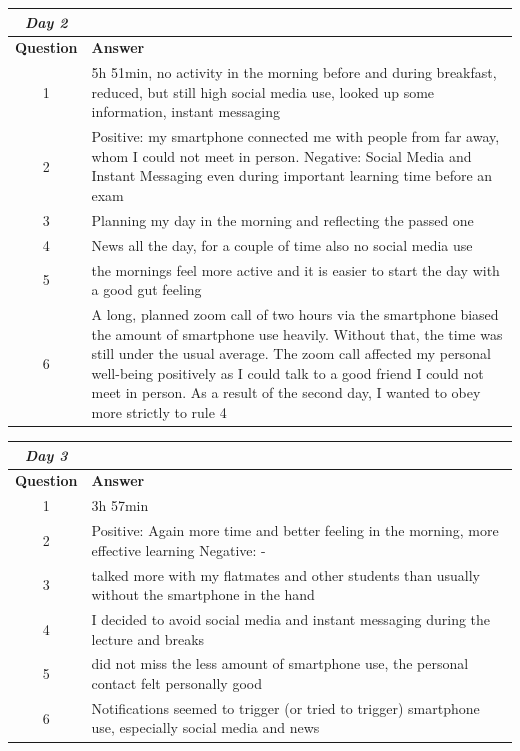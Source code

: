\begin{table}[H]
	\centering
	
\begin{tabularx}{\textwidth}{cb}
\textbf{\textit{Day 2}} &    \\ \midrule[2pt]	
	\textbf{Question}&\textbf{Answer}\\ \toprule[1.3pt]	
	1 & 5h 51min, no activity in the morning before and during breakfast, reduced, but still high social media use, looked up some information, instant messaging \\ \midrule[0.5pt]
	2 & Positive: my smartphone connected me with people from far away, whom I could not meet in person. Negative: Social Media and Instant Messaging even during important learning time before an exam \\ \midrule[0.5pt]
	3 & Planning my day in the morning and reflecting the passed one \\ \midrule[0.5pt]
	4 & News all the day, for a couple of time also no social media use \\ \midrule[0.5pt]
	5 & the mornings feel more active and it is easier to start the day with a good gut feeling \\ \midrule[0.5pt]
	6 & A long, planned zoom call of two hours via the smartphone biased the amount of smartphone use heavily. Without that, the time was still under the usual average. The zoom call affected my personal well-being positively as I could talk to a good friend I could not meet in person. As a result of the second day, I wanted to obey more strictly to rule 4  \\ \bottomrule[1.3pt]
\end{tabularx}

\end{table}

\begin{table}[H]
	\centering
	
\begin{tabularx}{\textwidth}{cb}
\textbf{\textit{Day 3}} &    \\ \midrule[2pt]	
	\textbf{Question}&\textbf{Answer}\\ \toprule[1.3pt]	
	1 & 3h 57min  \\ \midrule[0.5pt]
	2 & Positive: Again more time and better feeling in the morning, more effective learning Negative: - \\ \midrule[0.5pt]
	3 & talked more with my flatmates and other students than usually without the smartphone in the hand\\ \midrule[0.5pt]
	4 & I decided to avoid social media and instant messaging during the lecture and breaks \\ \midrule[0.5pt]
	5 & did not miss the less amount of smartphone use, the personal contact felt personally good \\ \midrule[0.5pt]
	6 & Notifications seemed to trigger (or tried to trigger) smartphone use, especially social media and news \\  \bottomrule[2pt]
\end{tabularx}

\end{table}


